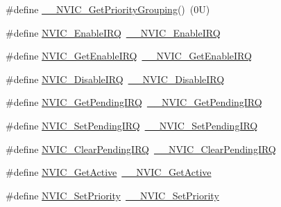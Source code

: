 \begin{DoxyCompactItemize}
\#define \hyperlink{group___c_m_s_i_s___core___n_v_i_c_functions_gab2072fe50f6d7cd208f6768919f59fae}{\+\_\+\+\_\+\+N\+V\+I\+C\+\_\+\+Get\+Priority\+Grouping}()~(0\+U)
\item 
\#define \hyperlink{group___c_m_s_i_s___core___n_v_i_c_functions_ga57b3064413dbc7459d9646020fdd8bef}{N\+V\+I\+C\+\_\+\+Enable\+I\+RQ}~\hyperlink{group___c_m_s_i_s___core___n_v_i_c_functions_ga71227e1376cde11eda03fcb62f1b33ea}{\+\_\+\+\_\+\+N\+V\+I\+C\+\_\+\+Enable\+I\+RQ}
\item 
\#define \hyperlink{group___c_m_s_i_s___core___n_v_i_c_functions_ga857de13232ec65dd15087eaa15bc4a69}{N\+V\+I\+C\+\_\+\+Get\+Enable\+I\+RQ}~\hyperlink{group___c_m_s_i_s___core___n_v_i_c_functions_gaaeb5e7cc0eaad4e2817272e7bf742083}{\+\_\+\+\_\+\+N\+V\+I\+C\+\_\+\+Get\+Enable\+I\+RQ}
\item 
\#define \hyperlink{group___c_m_s_i_s___core___n_v_i_c_functions_ga73b4e251f59cab4e9a5e234aac02ae57}{N\+V\+I\+C\+\_\+\+Disable\+I\+RQ}~\hyperlink{group___c_m_s_i_s___core___n_v_i_c_functions_gae016e4c1986312044ee768806537d52f}{\+\_\+\+\_\+\+N\+V\+I\+C\+\_\+\+Disable\+I\+RQ}
\item 
\#define \hyperlink{group___c_m_s_i_s___core___n_v_i_c_functions_gac608957a239466e9e0cbc30aa64feb3b}{N\+V\+I\+C\+\_\+\+Get\+Pending\+I\+RQ}~\hyperlink{group___c_m_s_i_s___core___n_v_i_c_functions_ga5a92ca5fa801ad7adb92be7257ab9694}{\+\_\+\+\_\+\+N\+V\+I\+C\+\_\+\+Get\+Pending\+I\+RQ}
\item 
\#define \hyperlink{group___c_m_s_i_s___core___n_v_i_c_functions_ga2b47e2e52cf5c48a5c3348636434b3ac}{N\+V\+I\+C\+\_\+\+Set\+Pending\+I\+RQ}~\hyperlink{group___c_m_s_i_s___core___n_v_i_c_functions_gaabefdd4b790b9a7308929938c0c1e1ad}{\+\_\+\+\_\+\+N\+V\+I\+C\+\_\+\+Set\+Pending\+I\+RQ}
\item 
\#define \hyperlink{group___c_m_s_i_s___core___n_v_i_c_functions_ga590cf113000a079b1f0ea3dcd5b5316c}{N\+V\+I\+C\+\_\+\+Clear\+Pending\+I\+RQ}~\hyperlink{group___c_m_s_i_s___core___n_v_i_c_functions_ga562a86dbdf14827d0fee8fdafb04d191}{\+\_\+\+\_\+\+N\+V\+I\+C\+\_\+\+Clear\+Pending\+I\+RQ}
\item 
\#define \hyperlink{group___c_m_s_i_s___core___n_v_i_c_functions_ga58ad3f352f832235ab3b192ff4745320}{N\+V\+I\+C\+\_\+\+Get\+Active}~\hyperlink{group___c_m_s_i_s___core___n_v_i_c_functions_gaa2837003c28c45abf193fe5e8d27f593}{\+\_\+\+\_\+\+N\+V\+I\+C\+\_\+\+Get\+Active}
\item 
\#define \hyperlink{group___c_m_s_i_s___core___n_v_i_c_functions_gae0e9d0e2f7b6133828c71b57d4941c35}{N\+V\+I\+C\+\_\+\+Set\+Priority}~\hyperlink{group___c_m_s_i_s___core___n_v_i_c_functions_ga505338e23563a9c074910fb14e7d45fd}{\+\_\+\+\_\+\+N\+V\+I\+C\+\_\+\+Set\+Priority}

\end{DoxyCompactItemize}
